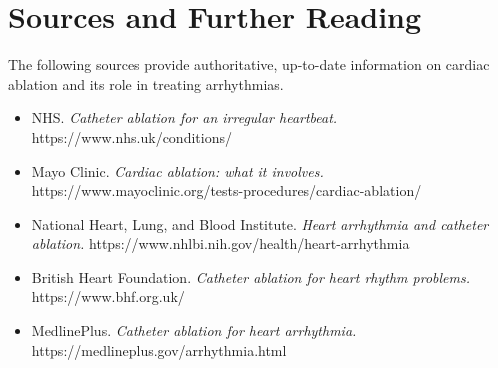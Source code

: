 \section*{Sources and Further Reading}
The following sources provide authoritative, up-to-date information on cardiac ablation and its role in treating arrhythmias.
\begin{itemize}
    \item NHS. \textit{Catheter ablation for an irregular heartbeat.} https://www.nhs.uk/conditions/
    \item Mayo Clinic. \textit{Cardiac ablation: what it involves.} https://www.mayoclinic.org/tests-procedures/cardiac-ablation/
    \item National Heart, Lung, and Blood Institute. \textit{Heart arrhythmia and catheter ablation.} https://www.nhlbi.nih.gov/health/heart-arrhythmia
    \item British Heart Foundation. \textit{Catheter ablation for heart rhythm problems.} https://www.bhf.org.uk/
    \item MedlinePlus. \textit{Catheter ablation for heart arrhythmia.} https://medlineplus.gov/arrhythmia.html
\end{itemize}

